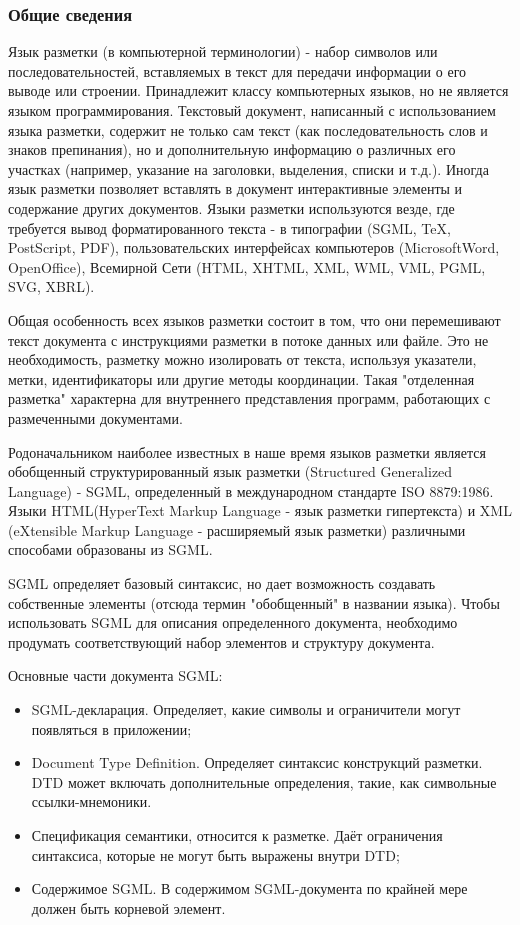 \documentclass[12pt,a4paper,oneside]{article} %
\begin{document}
\subsubsection{Общие сведения}

Язык разметки (в компьютерной терминологии) - набор символов или последовательностей, вставляемых в текст для передачи информации о его выводе или строении. Принадлежит классу компьютерных языков, но не является языком программирования. Текстовый документ, написанный с использованием языка разметки, содержит не только сам текст (как последовательность слов и знаков препинания), но и дополнительную информацию о различных его участках (например, указание на заголовки, выделения, списки и т.д.). Иногда язык разметки позволяет вставлять в документ интерактивные элементы и содержание других документов. Языки разметки используются везде, где требуется вывод форматированного текста - в типографии (SGML,  TeX, PostScript, PDF), пользовательских интерфейсах компьютеров (MicrosoftWord, OpenOffice), Всемирной Сети (HTML,  XHTML,  XML,  WML,  VML,  PGML,  SVG,  XBRL).

Общая особенность всех языков разметки состоит в том, что они перемешивают текст документа с инструкциями разметки в потоке данных или файле. Это не необходимость, разметку можно изолировать от текста, используя указатели, метки, идентификаторы или другие методы координации. Такая "отделенная разметка" характерна для внутреннего представления программ, работающих с размеченными документами.

Родоначальником наиболее известных в наше время языков разметки является обобщенный структурированный язык разметки (Structured Generalized Language) - SGML, определенный в международном стандарте ISO 8879:1986. Языки HTML(HyperText Markup Language - язык разметки гипертекста) и XML (eXtensible Markup Language - расширяемый язык разметки) различными способами образованы из SGML.

SGML определяет базовый синтаксис, но дает возможность создавать собственные элементы (отсюда термин "обобщенный" в названии языка). Чтобы использовать SGML для описания определенного документа, необходимо продумать соответствующий набор элементов и структуру документа.

Основные части документа SGML:

\begin{itemize}
\item SGML-декларация. Определяет, какие символы и ограничители могут появляться в приложении;
\item Document Type Definition. Определяет синтаксис конструкций разметки. DTD может включать дополнительные определения, такие, как символьные ссылки-мнемоники.

\item Спецификация семантики, относится к разметке. Даёт ограничения синтаксиса, которые не могут быть выражены внутри DTD;

\item Содержимое SGML. В содержимом SGML-документа по крайней мере должен быть корневой элемент.
\end{itemize}
\end{document}
